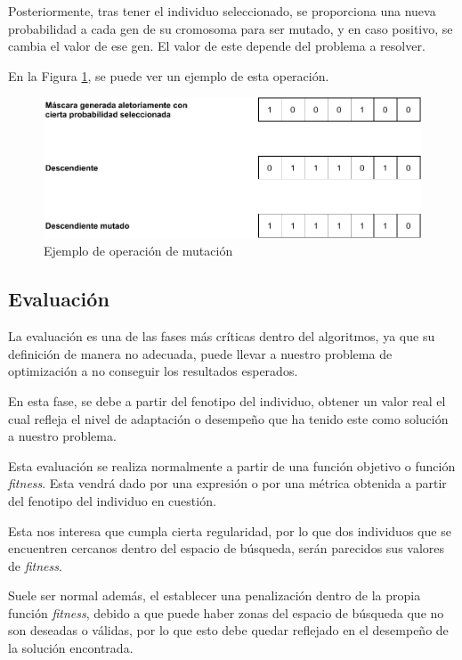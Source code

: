 Posteriormente, tras tener el individuo seleccionado, se proporciona una nueva probabilidad a cada gen de su cromosoma para ser mutado, y en caso positivo, se cambia el valor de ese gen. El valor de este depende del problema a resolver.

En la Figura \ref{fig:mutacion}, se puede ver un ejemplo de esta operación.\\

\begin{figure}[h]
         \centering
         \includegraphics[width=\textwidth]{figuras/desarrollo teorico/mutacion.pdf}
         \caption{Ejemplo de operación de mutación}
         \label{fig:mutacion}
    \end{figure}

\subsection{Evaluación}

La evaluación es una de las fases más críticas dentro del algoritmos, ya que su definición de manera no adecuada, puede llevar a nuestro problema de optimización a no conseguir los resultados esperados.

En esta fase, se debe a partir del fenotipo del individuo, obtener un valor real el cual refleja el nivel de adaptación o desempeño que ha tenido este como solución a nuestro problema.

Esta evaluación se realiza normalmente a partir de una función objetivo o función \textit{fitness}. Esta vendrá dado por una expresión o por una métrica obtenida a partir del fenotipo del individuo en cuestión.

Esta nos interesa que cumpla cierta regularidad, por lo que dos individuos que se encuentren cercanos dentro del espacio de búsqueda, serán parecidos sus valores de \textit{fitness}.

Suele ser normal además, el establecer una penalización dentro de la propia función \textit{fitness}, debido a que puede haber zonas del espacio de búsqueda que no son deseadas o válidas, por lo que esto debe quedar reflejado en el desempeño de la solución encontrada.

